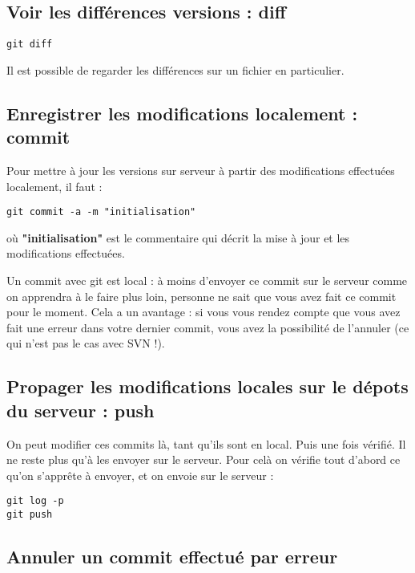 \documentclass[a4paper,twoside]{article}
\begin{document}
\subsection{Voir les différences versions : diff}

\begin{verbatim}
git diff
\end{verbatim}

\begin{remarque}
Il est possible de regarder les différences sur un fichier en particulier.
\end{remarque}

\subsection{Enregistrer les modifications localement : commit}\label{sec:commit}

Pour mettre à jour les versions sur serveur à partir des modifications effectuées localement, il faut : 
\begin{verbatim}
git commit -a -m "initialisation"
\end{verbatim}
où \textbf{"initialisation"} est le commentaire qui décrit la mise à jour et les modifications effectuées. 

\begin{attention}
Un commit avec git est local : à moins d’envoyer ce commit sur le serveur comme on apprendra à le faire plus loin, personne ne sait que vous avez fait ce commit pour le moment. Cela a un avantage : si vous vous rendez compte que vous avez fait une erreur dans votre dernier commit, vous avez la possibilité de l’annuler (ce qui n’est pas le cas avec SVN !).
\end{attention}

\subsection{Propager les modifications locales sur le dépots du serveur : push}
On peut modifier ces commits là, tant qu'ils sont en local. Puis une fois vérifié. Il ne reste plus qu'à les envoyer sur le serveur. Pour celà on vérifie tout d'abord ce qu'on s'apprête à envoyer, et on envoie sur le serveur : 
\begin{verbatim}
git log -p
git push
\end{verbatim}

\subsection{Annuler un commit effectué par erreur}
\end{document}
